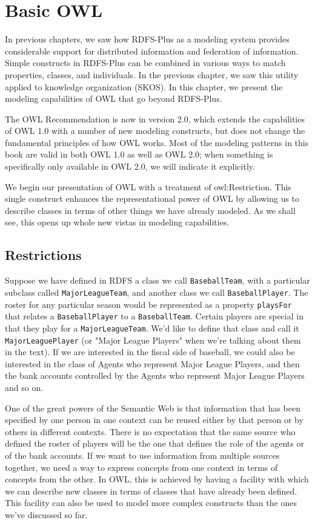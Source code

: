 \chapter{Basic OWL}
\label{ch12}

In previous chapters, we saw how RDFS-Plus as a modeling system provides
considerable support for distributed information and federation of
information. Simple constructs in RDFS-Plus can be combined in various
ways to match properties, classes, and individuals. In the previous
chapter, we saw this utility applied to knowledge organization (SKOS).
In this chapter, we present the modeling capabilities of OWL that go
beyond RDFS-Plus.

The OWL Recommendation is now in version 2.0, which extends the
capabilities of OWL 1.0 with a number of new modeling constructs, but
does not change the fundamental principles of how OWL works. Most of the
modeling patterns in this book are valid in both OWL 1.0 as well as OWL
2.0; when something is specifically only available in OWL 2.0, we will
indicate it explicitly.

We begin our presentation of OWL with a treatment of owl:Restriction.
This single
construct enhances the representational power of OWL by allowing us to
describe classes in terms of other things we have already modeled. As we
shall see, this opens up whole new vistas in modeling capabilities.

\section{Restrictions}

Suppose we have defined in RDFS a class we call \texttt{BaseballTeam}, with a
particular subclass called \texttt{MajorLeagueTeam}, and another class we call
\texttt{BaseballPlayer}. The roster for any particular season would be
represented as a property \texttt{playsFor} that relates a \texttt{BaseballPlayer} to a
\texttt{BaseballTeam}. Certain players are special in that they play for a
\texttt{MajorLeagueTeam}. We'd like to define that class and call it
\texttt{MajorLeaguePlayer} (or  "Major League Players"  when we're talking about them in the text). If we are interested in the fiscal side of baseball, we
could also be
interested in the class of Agents who represent Major League Players,
and then the bank accounts controlled by the Agents who represent Major
League Players and so on.

One of the great powers of the Semantic Web is that information that has
been specified by one person in one context can be reused either by that
person or by others in different contexts. There is no expectation that
the same source who defined the roster of players will be the one that
defines the role of the agents or of the bank accounts. If we want to
use information from multiple sources together, we need a way to express
concepts from one context in terms of concepts from the other. In OWL,
this is achieved by having a facility with which we can describe new
classes in terms of classes that have already been defined. This
facility can also be used to model more complex constructs than the ones
we've discussed so far.

